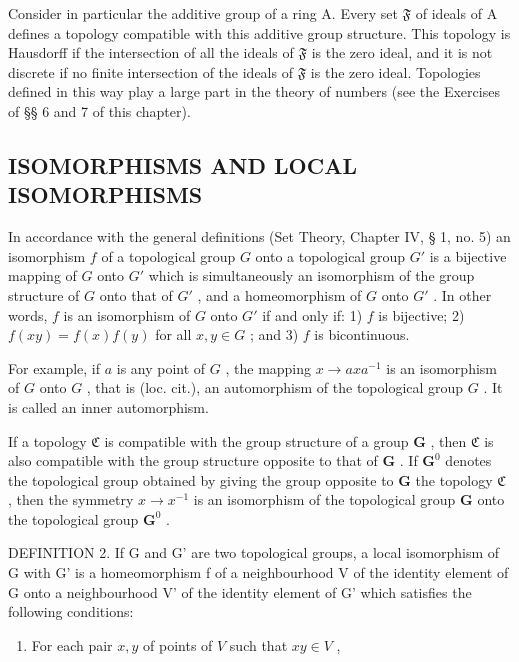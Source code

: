 Consider in particular the additive group of a ring A. Every set \(\mathfrak{F}\) of ideals of A defines a topology compatible with this additive group structure. This topology is Hausdorff if the intersection of all the ideals of \(\mathfrak{F}\) is the zero ideal, and it is not discrete if no finite intersection of the ideals of \(\mathfrak{F}\) is the zero ideal. Topologies defined in this way play a large part in the theory of numbers (see the Exercises of §§ 6 and 7 of this chapter).

\subsection{ISOMORPHISMS AND LOCAL ISOMORPHISMS}

In accordance with the general definitions (Set Theory, Chapter IV, § 1, no. 5) an isomorphism \(f\) of a topological group \(G\) onto a topological group \(G'\) is a bijective mapping of \(G\) onto \(G'\) which is simultaneously an isomorphism of the group structure of \(G\) onto that of \(G'\) , and a homeomorphism of \(G\) onto \(G'\) . In other words, \(f\) is an isomorphism of \(G\) onto \(G'\) if and only if: 1) \(f\) is bijective; 2) \(f(xy) = f(x)f(y)\) for all \(x, y \in G\) ; and 3) \(f\) is bicontinuous.

For example, if \(a\) is any point of \(G\) , the mapping \(x \to axa^{-1}\) is an isomorphism of \(G\) onto \(G\) , that is (loc. cit.), an automorphism of the topological group \(G\) . It is called an inner automorphism.

If a topology \(\mathfrak{C}\) is compatible with the group structure of a group \(\mathbf{G}\) , then \(\mathfrak{C}\) is also compatible with the group structure opposite to that of \(\mathbf{G}\) . If \(\mathbf{G}^0\) denotes the topological group obtained by giving the group opposite to \(\mathbf{G}\) the topology \(\mathfrak{C}\) , then the symmetry \(x \to x^{-1}\) is an isomorphism of the topological group \(\mathbf{G}\) onto the topological group \(\mathbf{G}^0\) .

DEFINITION 2. If G and G' are two topological groups, a local isomorphism of G with G' is a homeomorphism f of a neighbourhood V of the identity element of G onto a neighbourhood V' of the identity element of G' which satisfies the following conditions:

\begin{enumerate}
\def\labelenumi{\arabic{enumi})}
\tightlist
\item
  For each pair \(x, y\) of points of \(V\) such that \(xy \in V\) ,
\end{enumerate}

